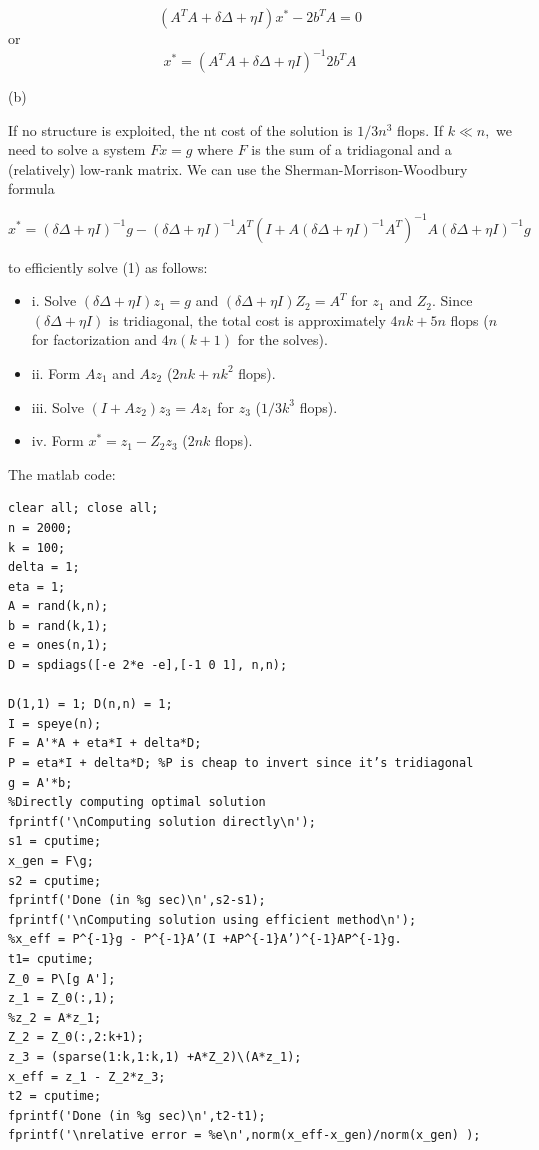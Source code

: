 \documentclass{article}
\begin{document}
$$
(A^TA + \delta \Delta + \eta I)x^* - 2b^T A = 0
$$
or
$$
x^* = (A^TA + \delta \Delta + \eta I)^{-1} 2b^T A 
$$

(b)

If no structure is exploited, the nt cost of the solution is $1/3 n^3$ flops. If $k \ll n,$ we need to solve a system $Fx = g$ where $F$ is the sum of a tridiagonal
and a (relatively) low-rank matrix. We can use the Sherman-Morrison-Woodbury formula

$$
x^* = (\delta \Delta + \eta I)^{-1} g - 
(\delta \Delta + \eta I)^{-1} A^T 
(I + A(\delta \Delta + \eta I )^{-1} A^T)^{-1} A 
 (\delta \Delta + \eta I)^{-1} g
$$

to efficiently solve (1) as follows:

\begin{itemize}
	\item i. Solve $(\delta \Delta + \eta I) z_1 = g$ and 
	$(\delta \Delta + \eta I) Z_2 = A^T$ for $z_1$ and $Z_2.$ Since $(\delta \Delta + \eta I)$ is tridiagonal, the total cost is approximately 
	$4 nk + 5n$ flops ($n$ for factorization and $4n(k + 1)$ for the solves).	
	\item ii. Form $Az_1$ and $Az_2$ ($2 nk + nk^2$ flops).
	\item iii. Solve $(I + Az_2) z_3 = Az_1$ for $z_3$ 
	($1/3 k^3$ flops).
	\item iv. Form $x^* = z_1 - Z_2 z_3$ ($2nk$ flops).
	
\end{itemize}

The matlab code:
\begin{verbatim}
clear all; close all;
n = 2000;
k = 100;
delta = 1;
eta = 1;
A = rand(k,n);
b = rand(k,1);
e = ones(n,1);
D = spdiags([-e 2*e -e],[-1 0 1], n,n);

D(1,1) = 1; D(n,n) = 1;
I = speye(n);
F = A'*A + eta*I + delta*D;
P = eta*I + delta*D; %P is cheap to invert since it’s tridiagonal
g = A'*b;
%Directly computing optimal solution
fprintf('\nComputing solution directly\n');
s1 = cputime;
x_gen = F\g;
s2 = cputime;
fprintf('Done (in %g sec)\n',s2-s1);
fprintf('\nComputing solution using efficient method\n');
%x_eff = P^{-1}g - P^{-1}A’(I +AP^{-1}A’)^{-1}AP^{-1}g.
t1= cputime;
Z_0 = P\[g A'];
z_1 = Z_0(:,1);
%z_2 = A*z_1;
Z_2 = Z_0(:,2:k+1);
z_3 = (sparse(1:k,1:k,1) +A*Z_2)\(A*z_1);
x_eff = z_1 - Z_2*z_3;
t2 = cputime;
fprintf('Done (in %g sec)\n',t2-t1);
fprintf('\nrelative error = %e\n',norm(x_eff-x_gen)/norm(x_gen) );	
\end{verbatim}
\end{document}
